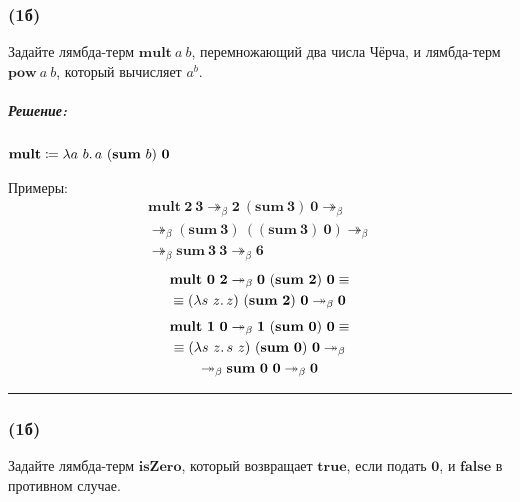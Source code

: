 \documentclass{article}
\newenvironment{proof}{\subparagraph{\hspace{-1em}Решение:\newline}\-}{\par\noindent\rule{\textwidth}{0.4pt}}
\newcommand{\term}[1]{\mathbf{#1}}
\newcommand{\betasteps}{\twoheadrightarrow_\beta}
\begin{document}
    \subsubsection{(1б)}

    Задайте лямбда-терм $\term{mult}~a~b$, перемножающий два числа Чёрча, и лямбда-терм $\term{pow}~a~b$, который вычисляет $a^b$.

    \begin{proof}
        \(\textbf{mult} \coloneqq \lambda a~b\ldotp a~(\term{sum}~b)~\term{0}\)

        Примеры:
        \begin{gather}
            \term{mult}~\term{2}~\term{3} \betasteps \term{2}~(\term{sum}~\term{3})~\term{0} \betasteps \\
            \betasteps (\term{sum}~\term{3})~((\term{sum}~\term{3})~\term{0}) \betasteps \\
            \betasteps \term{sum}~\term{3}~\term{3} \betasteps \term{6}
        \end{gather}
        \begin{gather}
            \term{mult}~\term{0}~\term{2} \betasteps \term{0}~(\term{sum}~\term{2})~\term{0} \equiv \\
            \equiv (\lambda s~z\ldotp z)~(\term{sum}~\term{2})~\term{0} \betasteps \term{0}
        \end{gather}
        \begin{gather}
            \term{mult}~\term{1}~\term{0} \betasteps \term{1}~(\term{sum}~\term{0})~\term{0} \equiv \\
            \equiv (\lambda s~z\ldotp s~z)~(\term{sum}~\term{0})~\term{0} \betasteps \\
            \betasteps \term{sum}~\term{0}~\term{0} \betasteps \term{0}
        \end{gather}
    \end{proof}

    \subsubsection{(1б)}

    Задайте лямбда-терм $\term{isZero}$, который возвращает $\term{true}$, если подать $\term{0}$, и $\term{false}$ в противном случае.
\end{document}
